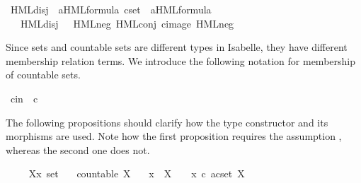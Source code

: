 \begin{isabellebody}
\isamarkupfalse%
\ HML{\isacharunderscore}{\kern0pt}disj\ {\isacharcolon}{\kern0pt}{\isacharcolon}{\kern0pt}\ {\isacartoucheopen}{\isacharparenleft}{\kern0pt}{\isacharprime}{\kern0pt}a{\isacharparenright}{\kern0pt}HML{\isacharunderscore}{\kern0pt}formula\ cset\ {\isasymRightarrow}\ {\isacharparenleft}{\kern0pt}{\isacharprime}{\kern0pt}a{\isacharparenright}{\kern0pt}HML{\isacharunderscore}{\kern0pt}formula{\isacartoucheclose}\ %
\isamarkupcmt{$\bigvee \Phi$%
}\isanewline
\ \ \ {\isacartoucheopen}HML{\isacharunderscore}{\kern0pt}disj\ {\isasymPhi}\ {\isasymequiv}\ HML{\isacharunderscore}{\kern0pt}neg\ {\isacharparenleft}{\kern0pt}HML{\isacharunderscore}{\kern0pt}conj\ {\isacharparenleft}{\kern0pt}cimage\ HML{\isacharunderscore}{\kern0pt}neg\ {\isasymPhi}{\isacharparenright}{\kern0pt}{\isacharparenright}{\kern0pt}{\isacartoucheclose}%
\isadelimdocument
%
\endisadelimdocument
%
\isatagdocument
%
\isamarkuptrue%
%
\endisatagdocument
{\isafolddocument}%
%
\isadelimdocument
%
\endisadelimdocument
%
\begin{isamarkuptext}%
Since sets  and countable sets  are different types in Isabelle, they have different membership relation terms. We introduce the following notation for membership of countable sets.%
\end{isamarkuptext}\isamarkuptrue%
\isamarkupfalse%
\ cin\ {\isacharparenleft}{\kern0pt}{\isacartoucheopen}{\isacharunderscore}{\kern0pt}\ {\isasymin}\isactrlsub c\ {\isacharunderscore}{\kern0pt}{\isacartoucheclose}\ {\isacharbrackleft}{\kern0pt}{}{}{}{\isacharcomma}{\kern0pt}\ {}{}{}{\isacharbrackright}{\kern0pt}\ {}{}{}{\isacharparenright}{\kern0pt}%
\begin{isamarkuptext}%
The following propositions should clarify how the type constructor  and its morphisms are used. Note how the first proposition requires the assumption , whereas the second one does not.%
\end{isamarkuptext}\isamarkuptrue%
\isamarkupfalse%
\ \isanewline
\ \ \ X{\isacharcolon}{\kern0pt}{\isacharcolon}{\kern0pt}{\isacartoucheopen}{\isacharprime}{\kern0pt}x\ set{\isacartoucheclose}\isanewline
\ \ \ {\isacartoucheopen}countable\ X{\isacartoucheclose}\isanewline
\ \ \ {\isacartoucheopen}x\ {\isasymin}\ X\ \ {\isasymLongleftrightarrow}\ \ x\ {\isasymin}\isactrlsub c\ acset\ X{\isacartoucheclose}\ \isanewline

\end{isabellebody}
